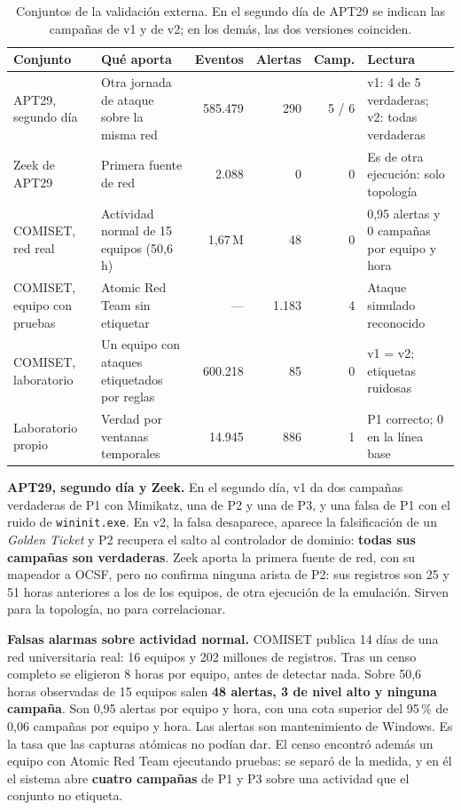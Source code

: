 \begin{table}[H]
\centering
\small
\setlength{\tabcolsep}{4pt}
\begin{tabular}{|p{2.6cm}|p{3.4cm}|r|r|r|p{3.3cm}|}
\hline
\textbf{Conjunto} & \textbf{Qué aporta} & \textbf{Eventos} & \textbf{Alertas} & \textbf{Camp.} & \textbf{Lectura} \\
\hline
APT29, segundo día \cite{otrf} & Otra jornada de ataque sobre la misma red & 585.479 & 290 & 5 / 6 & v1: 4 de 5 verdaderas; v2: todas verdaderas \\
Zeek de APT29 \cite{otrf} & Primera fuente de red & 2.088 & 0 & 0 & Es de otra ejecución: solo topología \\
COMISET, red real \cite{comiset} & Actividad normal de 15 equipos (50,6\,h) & 1,67\,M & 48 & 0 & 0,95 alertas y 0 campañas por equipo y hora \\
COMISET, equipo con pruebas & Atomic Red Team \cite{atomicredteam} sin etiquetar & --- & 1.183 & 4 & Ataque simulado reconocido \\
COMISET, laboratorio \cite{comiset} & Un equipo con ataques etiquetados por reglas & 600.218 & 85 & 0 & v1 = v2; etiquetas ruidosas \\
Laboratorio propio & Verdad por ventanas temporales & 14.945 & 886 & 1 & P1 correcto; 0 en la línea base \\
\hline
\end{tabular}
\caption{Conjuntos de la validación externa. En el segundo día de APT29 se indican las campañas de
v1 y de v2; en los demás, las dos versiones coinciden.}
\label{tab:validacion-externa}
\end{table}

\medskip\noindent\textbf{APT29, segundo día y Zeek.} En el segundo día, v1 da dos campañas verdaderas de P1
con Mimikatz, una de P2 y una de P3, y una falsa de P1 con el ruido de \texttt{wininit.exe}. En v2,
la falsa desaparece, aparece la falsificación de un \textit{Golden Ticket} y P2 recupera el salto al
controlador de dominio: \textbf{todas sus campañas son verdaderas}. Zeek aporta la primera fuente de
red, con su mapeador a OCSF, pero no confirma ninguna arista de P2: sus registros son 25 y 51 horas
anteriores a los de los equipos, de otra ejecución de la emulación. Sirven para la topología, no para
correlacionar.

\medskip\noindent\textbf{Falsas alarmas sobre actividad normal.} COMISET \cite{comiset} publica 14 días de
una red universitaria real: 16 equipos y 202 millones de registros. Tras un censo completo se
eligieron 8 horas por equipo, antes de detectar nada. Sobre 50,6 horas observadas de 15 equipos
salen \textbf{48 alertas, 3 de nivel alto y ninguna campaña}. Son 0,95 alertas por equipo y hora, con
una cota superior del 95\,\% de 0,06 campañas por equipo y hora. Las alertas son mantenimiento de
Windows. Es la tasa que las capturas atómicas no podían dar. El censo encontró además un equipo con
Atomic Red Team ejecutando pruebas: se separó de la medida, y en él el sistema abre \textbf{cuatro
campañas} de P1 y P3 sobre una actividad que el conjunto no etiqueta.

